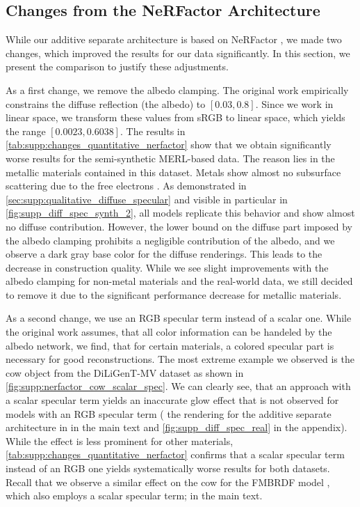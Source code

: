 \subsection{Changes from the NeRFactor Architecture}
\label{sec:supp:changes_nerfactor}




While our additive separate architecture is based on NeRFactor \cite{Zhang2021NeRFactor}, we made two changes, which improved the results for our data significantly. In this section, we present the comparison to justify these adjustments.

As a first change, we remove the albedo clamping. The original work empirically constrains the diffuse reflection (\ie the albedo) to $[0.03, 0.8]$. Since we work in linear space, we transform these values from sRGB to linear space, which yields the range $[0.0023, 0.6038]$. The results in \cref{tab:supp:changes_quantitative_nerfactor} show that we obtain significantly worse results for the semi-synthetic MERL-based data. The reason lies in the metallic materials contained in this dataset. Metals show almost no subsurface scattering due to the free electrons \cite{akenine2019realTimeRendering}. As demonstrated in \cref{sec:supp:qualitative_diffuse_specular} and visible in particular in \cref{fig:supp_diff_spec_synth_2}, all models replicate this behavior and show almost no diffuse contribution. However, the lower bound on the diffuse part imposed by the albedo clamping prohibits a negligible contribution of the albedo, and we observe a dark gray base color for the diffuse renderings. This leads to the decrease in construction quality. While we see slight improvements with the albedo clamping for non-metal materials and the real-world data, we still decided to remove it due to the significant performance decrease for metallic materials.

As a second change, we use an RGB specular term instead of a scalar one. While the original work assumes, that all color information can be handeled by the albedo network, we find, that for certain materials, a colored specular part is necessary for good reconstructions. The most extreme example we observed is the cow object from the DiLiGenT-MV dataset \cite{Li2020DiLiGentMVDataset} as shown in \cref{fig:supp:nerfactor_cow_scalar_spec}. We can clearly see, that an approach with a scalar specular term yields an inaccurate glow effect that is not observed for models with an RGB specular term (\cf
the rendering for the additive separate architecture in
\iftoggle{arxiv}{\cref{fig:evaluation_renderings}}{Fig.~3}
in the main text and \cref{fig:supp_diff_spec_real} in the appendix).
While the effect is less prominent for other materials, \cref{tab:supp:changes_quantitative_nerfactor} confirms that a scalar specular term instead of an RGB one yields systematically worse results for both datasets. Recall that we observe a similar effect on the cow for the FMBRDF model \cite{ichikawa2023fresnel}, which also employs a scalar specular term; \cf
\iftoggle{arxiv}{\cref{sec:comparison_brdf_models}}{Sec.~6.1}
in the main text.

